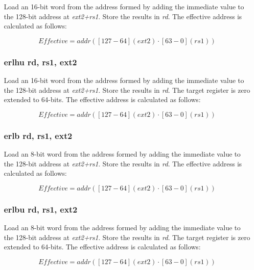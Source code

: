 \documentclass{article}
\begin{document}
Load an 16-bit word from the address formed by adding the immediate value to the 
128-bit address at \textit{ext2+rs1}.  Store the results in \textit{rd}.  
The effective address is calculated as follows:

\begin{equation}
Effective = addr([127-64](ext2) \cdot [63-0](rs1))
\end{equation}

\subsubsection{erlhu rd, rs1, ext2}

Load an 16-bit word from the address formed by adding the immediate value to the 
128-bit address at \textit{ext2+rs1}.  Store the results in \textit{rd}.  
 The target register is zero extended to 64-bits.  The effective 
address is calculated as follows:

\begin{equation}
Effective = addr([127-64](ext2) \cdot [63-0](rs1))
\end{equation}

\subsubsection{erlb rd, rs1, ext2}

Load an 8-bit word from the address formed by adding the immediate value to the 
128-bit address at \textit{ext2+rs1}.  Store the results in \textit{rd}.  
The effective address is calculated as follows: 

\begin{equation}
Effective = addr([127-64](ext2) \cdot [63-0](rs1))
\end{equation}

\subsubsection{erlbu rd, rs1, ext2}

Load an 8-bit word from the address formed by adding the immediate value to the 
128-bit address at \textit{ext2+rs1}.  Store the results in \textit{rd}.  
 The target register is zero extended to 64-bits.  The effective 
address is calculated as follows: 

\begin{equation}
Effective = addr([127-64](ext2) \cdot [63-0](rs1))
\end{equation}
\end{document}
